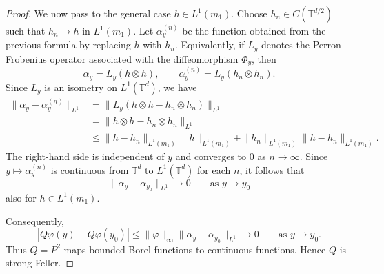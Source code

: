 \documentclass[10pt,a4paper]{amsart}
\newcommand{\Tt}{{\mathbb{T}}}
\begin{document}
\begin{proof}
We now pass to the general case $h\in L^1(m_1)$. Choose $h_n\in C(\Tt^{d/2})$ such that $h_n\to h$ in $L^1(m_1)$. Let $\alpha_y^{(n)}$ be the function obtained from the previous formula by replacing $h$ with $h_n$. Equivalently, if $L_y$ denotes the Perron--Frobenius operator associated with the diffeomorphism $\Phi_y$, then
\[
\alpha_y=L_y(h\otimes h),
\qquad
\alpha_y^{(n)}=L_y(h_n\otimes h_n).
\]
Since $L_y$ is an isometry on $L^1(\Tt^d)$, we have
\[
\begin{aligned}
\|\alpha_y-\alpha_y^{(n)}\|_{L^1}
&=
\|L_y(h\otimes h-h_n\otimes h_n)\|_{L^1} \\
&=
\|h\otimes h-h_n\otimes h_n\|_{L^1} \\
&\leq
\|h-h_n\|_{L^1(m_1)}\|h\|_{L^1(m_1)}
+
\|h_n\|_{L^1(m_1)}\|h-h_n\|_{L^1(m_1)}.
\end{aligned}
\]
The right-hand side is independent of $y$ and converges to $0$ as $n\to\infty$. Since $y\mapsto\alpha_y^{(n)}$ is continuous from $\Tt^d$ to $L^1(\Tt^d)$ for each $n$, it follows that
\[
\|\alpha_y-\alpha_{y_0}\|_{L^1}\longrightarrow 0
\qquad\text{as }y\to y_0
\]
also for $h\in L^1(m_1)$.

Consequently,
\[
\left|Q\varphi(y)-Q\varphi(y_0)\right|
\leq
\|\varphi\|_\infty\|\alpha_y-\alpha_{y_0}\|_{L^1}
\longrightarrow 0
\qquad\text{as }y\to y_0.
\]
Thus $Q=P^2$ maps bounded Borel functions to continuous functions. Hence $Q$ is strong Feller.
\end{proof}
\end{document}
